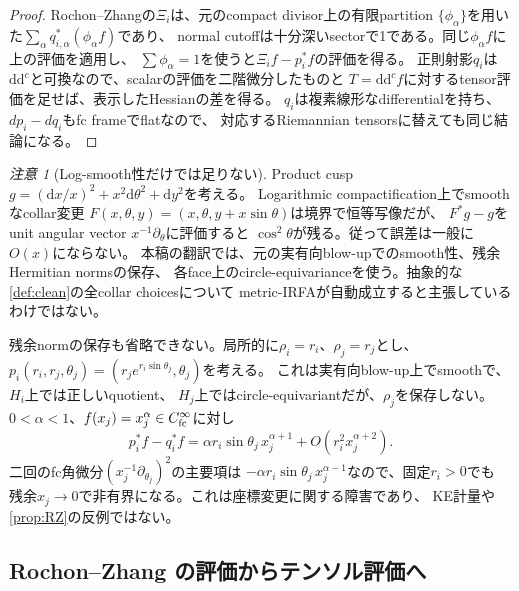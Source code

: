\documentclass[11pt,a4paper]{ltjsarticle}
\newcommand{\dd}{\mathrm d}
\theoremstyle{plain}
\theoremstyle{definition}
\theoremstyle{remark}
\newtheorem{remark}[remark]{注意}
\begin{document}
\begin{proof}
Rochon--Zhangの$\Xi_i$は、元のcompact divisor上の有限partition
$\{\phi_\alpha\}$を用いた$\sum_\alpha q_{i,\alpha}^*(\phi_\alpha f)$であり、
normal cutoffは十分深いsectorで1である。同じ$\phi_\alpha f$に上の評価を適用し、
$\sum\phi_\alpha=1$を使うと$\Xi_i f-p_i^*f$の評価を得る。
正則射影$q_i$は$\dd\dd^c$と可換なので、scalarの評価を二階微分したものと
$T=\dd\dd^cf$に対するtensor評価を足せば、表示したHessianの差を得る。
$q_i$は複素線形なdifferentialを持ち、$dp_i-dq_i$もfc frameでflatなので、
対応するRiemannian tensorsに替えても同じ結論になる。
\end{proof}


\begin{remark}[Log-smooth性だけでは足りない]
\label{rem:log-collar-obstruction}
Product cusp $g=(\dd x/x)^2+x^2\dd\theta^2+\dd y^2$を考える。
Logarithmic compactification上でsmoothなcollar変更
$F(x,\theta,y)=(x,\theta,y+x\sin\theta)$は境界で恒等写像だが、
$F^*g-g$をunit angular vector $x^{-1}\partial_\theta$に評価すると
$\cos^2\theta$が残る。従って誤差は一般に$O(x)$にならない。
本稿の翻訳では、元の実有向blow-upでのsmooth性、残余Hermitian normsの保存、
各face上のcircle-equivarianceを使う。抽象的な\cref{def:clean}の全collar choicesについて
metric-IRFAが自動成立すると主張しているわけではない。

残余normの保存も省略できない。局所的に$\rho_i=r_i$、$\rho_j=r_j$とし、
$p_i(r_i,r_j,\theta_j)=(r_j e^{r_i\sin\theta_j},\theta_j)$を考える。
これは実有向blow-up上でsmoothで、$H_i$上では正しいquotient、
$H_j$上ではcircle-equivariantだが、$\rho_j$を保存しない。
$0<\alpha<1$、$f(x_j)=x_j^\alpha\in C^\infty_{\rm fc}$に対し
\[
 p_i^*f-q_i^*f
 =\alpha r_i\sin\theta_j\,x_j^{\alpha+1}
  +O(r_i^2x_j^{\alpha+2}).
\]
二回のfc角微分$(x_j^{-1}\partial_{\theta_j})^2$の主要項は
$-\alpha r_i\sin\theta_j\,x_j^{\alpha-1}$なので、固定$r_i>0$でも
残余$x_j\to0$で非有界になる。これは座標変更に関する障害であり、
KE計量や\cref{prop:RZ}の反例ではない。
\end{remark}

\subsection{Rochon--Zhang の評価からテンソル評価へ}
\end{document}
